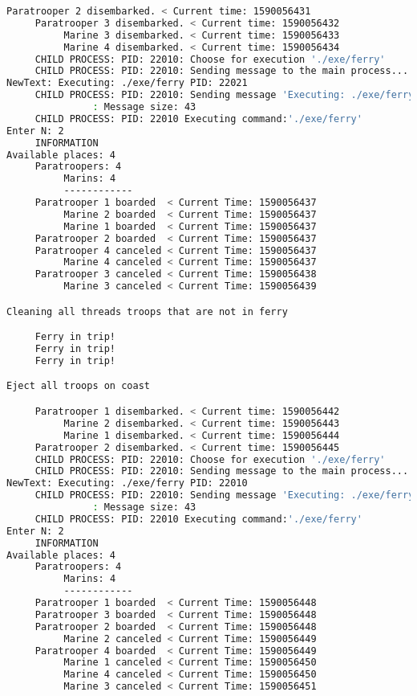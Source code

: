 \documentclass{article}
\begin{document}
\begin{lstlisting}[language=BASH]
     Paratrooper 2 disembarked. < Current time: 1590056431
     Paratrooper 3 disembarked. < Current time: 1590056432
          Marine 3 disembarked. < Current time: 1590056433
          Marine 4 disembarked. < Current time: 1590056434
     CHILD PROCESS: PID: 22010: Choose for execution './exe/ferry'
     CHILD PROCESS: PID: 22010: Sending message to the main process...
NewText: Executing: ./exe/ferry PID: 22021
     CHILD PROCESS: PID: 22010: Sending message 'Executing: ./exe/ferry PID: 22021' to the MAIN process...
               : Message size: 43
     CHILD PROCESS: PID: 22010 Executing command:'./exe/ferry'
Enter N: 2
     INFORMATION
Available places: 4
     Paratroopers: 4
          Marins: 4
          ------------
     Paratrooper 1 boarded  < Current Time: 1590056437 
          Marine 2 boarded  < Current Time: 1590056437 
          Marine 1 boarded  < Current Time: 1590056437 
     Paratrooper 2 boarded  < Current Time: 1590056437 
     Paratrooper 4 canceled < Current Time: 1590056437 
          Marine 4 canceled < Current Time: 1590056437 
     Paratrooper 3 canceled < Current Time: 1590056438 
          Marine 3 canceled < Current Time: 1590056439 

Cleaning all threads troops that are not in ferry

     Ferry in trip!
     Ferry in trip!
     Ferry in trip!

Eject all troops on coast

     Paratrooper 1 disembarked. < Current time: 1590056442
          Marine 2 disembarked. < Current time: 1590056443
          Marine 1 disembarked. < Current time: 1590056444
     Paratrooper 2 disembarked. < Current time: 1590056445
     CHILD PROCESS: PID: 22010: Choose for execution './exe/ferry'
     CHILD PROCESS: PID: 22010: Sending message to the main process...
NewText: Executing: ./exe/ferry PID: 22010
     CHILD PROCESS: PID: 22010: Sending message 'Executing: ./exe/ferry PID: 22010' to the MAIN process...
               : Message size: 43
     CHILD PROCESS: PID: 22010 Executing command:'./exe/ferry'
Enter N: 2
     INFORMATION
Available places: 4
     Paratroopers: 4
          Marins: 4
          ------------
     Paratrooper 1 boarded  < Current Time: 1590056448 
     Paratrooper 3 boarded  < Current Time: 1590056448 
     Paratrooper 2 boarded  < Current Time: 1590056448 
          Marine 2 canceled < Current Time: 1590056449 
     Paratrooper 4 boarded  < Current Time: 1590056449 
          Marine 1 canceled < Current Time: 1590056450 
          Marine 4 canceled < Current Time: 1590056450 
          Marine 3 canceled < Current Time: 1590056451 


\end{lstlisting}
\end{document}
